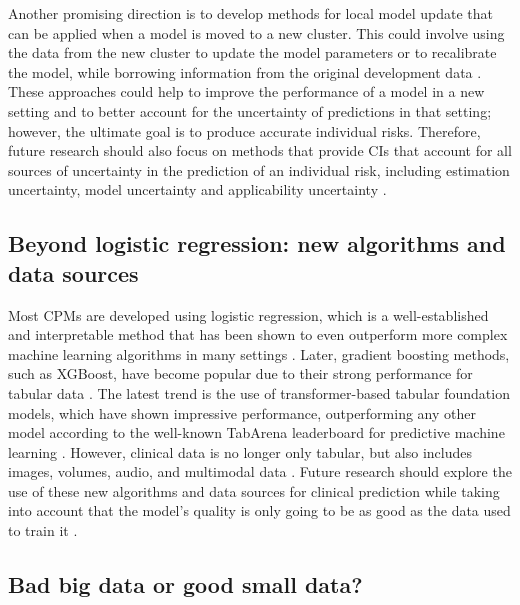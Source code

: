 Another promising direction is to develop methods for local model update that can be applied when a model is moved to a new cluster. This could involve using the data from the new cluster to update the model parameters or to recalibrate the model, while borrowing information from the original development data \cite{jenkinsContinualUpdatingMonitoring2021, van2026enemies}. 
These approaches could help to improve the performance of a model in a new setting and to better account for the uncertainty of predictions in that setting; however, the ultimate goal is to produce accurate individual risks. Therefore, future research should also focus on methods that provide \glspl{CI} that account for all sources of uncertainty in the prediction of an individual risk, including estimation uncertainty, model uncertainty and applicability uncertainty \cite{barrenadaFundamentalProblemRisk2025}. 

\subsection{Beyond logistic regression: new algorithms and data sources}
Most \glspl{CPM} are developed using logistic regression, which is a well-established and interpretable method that has been shown to even outperform more complex machine learning algorithms in many settings \cite{christodoulouSystematicReviewShows2019}. Later, gradient boosting methods, such as XGBoost, have become popular due to their strong performance for tabular data \cite{grinsztajnWhyDoTreeBased2022, chenXGBoostScalableTree2016}. The latest trend is the use of transformer-based tabular foundation models, which have shown impressive performance, outperforming any other model according to the well-known TabArena leaderboard for predictive machine learning \cite{quTabICLv2BetterFaster2026, hollmannAccuratePredictionsSmall2025, quTabICLTabularFoundation2025, ericksonTabArenaLivingBenchmark2025}. However, clinical data is no longer only tabular, but also includes images, volumes, audio, and multimodal data \cite{baltrusaitisMultimodalMachineLearning2017}. Future research should explore the use of these new algorithms and data sources for clinical prediction while taking into account that the model's quality is only going to be as good as the data used to train it \cite{Sanders2017GARBAGEIG}. 

\subsection{Bad big data or good small data?}

